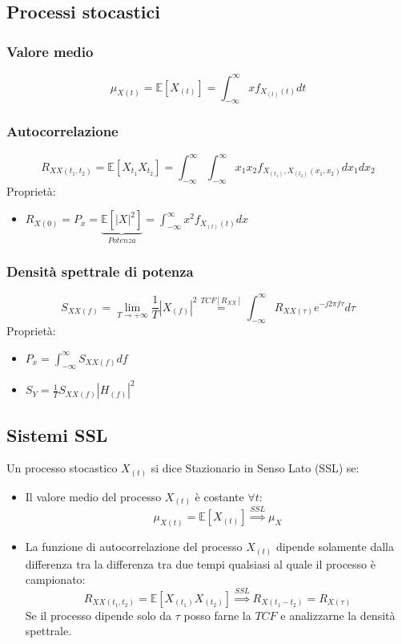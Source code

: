     \subsection{Processi stocastici}
        \subsubsection{Valore medio}
            \[
                \mu_{X(t)} = \mathbb{E}[X_{(t)}] = \int_{-\infty}^{\infty}xf_{X_{(t)}(t)}dt
            \]
        \subsubsection{Autocorrelazione}
            \[
                R_{XX(t_1,t_2)} = \mathbb{E}[X_{t_1}X_{t_2}] = \int_{-\infty}^{\infty}\int_{-\infty}^{\infty} x_1x_2f_{X_{(t_1)},X_{(t_2)}(x_1,x_2)}dx_1dx_2
            \]  
            Proprietà:
            \begin{itemize}
                \item {$R_{X(0)}=P_x = \underset{Potenza}{\underbrace{\mathbb{E}[|X|^2]}} = \int_{-\infty}^{\infty} x^2f_{X_{(t)}(t)}dx$}
            \end{itemize}
        \subsubsection{Densità spettrale di potenza}
            \[
                S_{XX(f)} = \lim_{T\rightarrow+\infty}\frac{1}{T}|X_{(f)}|^2 \overset{TCF[R_{XX}]}{=} \int_{-\infty}^{\infty} R_{XX(\tau)} e^{-j2\pi f\tau}d\tau
            \]
            Proprietà:
            \begin{itemize}
                \item {$P_x = \int_{-\infty}^{\infty} S_{XX(f)} df$}
                \item {$S_{Y} = \frac{1}{T} S_{XX(f)} |H_{(f)}|^2$}
            \end{itemize}
    \subsection{Sistemi SSL}
        Un processo stocastico $X_{(t)}$ si dice Stazionario in Senso Lato (SSL) se:
        \begin{itemize}
            \item {Il valore medio del processo $X_{(t)}$ è costante $\forall t$:
                \[
                    \mu_{X(t)} = \mathbb{E}[X_{(t)}] \overset{SSL}{\Rightarrow} \mu_{X}    
                \]
            }
            \item {La funzione di autocorrelazione del processo $X_{(t)}$ dipende solamente dalla differenza tra la differenza 
                tra due tempi qualsiasi al quale il processo è campionato:
                \[
                    R_{XX(t_1,t_2)} = \mathbb{E}[X_{(t_1)}X_{(t_2)}] \overset{SSL}{\Rightarrow} R_{X(t_1-t_2)} = R_{X(\tau)}      
                \]
                Se il processo dipende solo da $\tau$ posso farne la $TCF$ e analizzarne la densità spettrale. 
                }
        \end{itemize}
